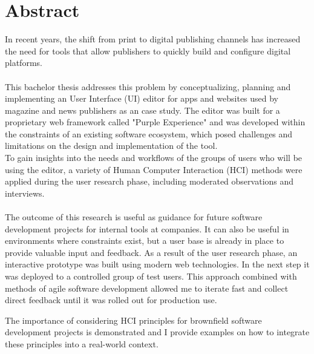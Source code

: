 %

\chapter{Abstract}

In recent years, the shift from print to digital publishing channels has increased the need for tools that allow publishers to quickly build and configure digital platforms.
\\\\
This bachelor thesis addresses this problem by conceptualizing, planning and implementing an User Interface (UI) editor for apps and websites used by magazine and news publishers as an case study.
The editor was built for a proprietary web framework called "Purple Experience" and was developed within the constraints of an existing software ecosystem, which posed challenges and limitations on the design and implementation of the tool.
\\
To gain insights into the needs and workflows of the groups of users who will be using the editor, a variety of Human Computer Interaction (HCI) methods were applied during the user research phase, including moderated observations and interviews. 
\\\\
The outcome of this research is useful as guidance for future software development projects for internal tools at companies. It can also be useful in environments where constraints exist, but a user base is already in place to provide valuable input and feedback.
As a result of the user research phase, an interactive prototype was built using modern web technologies.
In the next step it was deployed to a controlled group of test users.
This approach combined with methods of agile software development allowed me to iterate fast and collect direct feedback until it was rolled out for production use.

The importance of considering HCI principles for brownfield software development projects is demonstrated and I provide examples on how to integrate these principles into a real-world context.